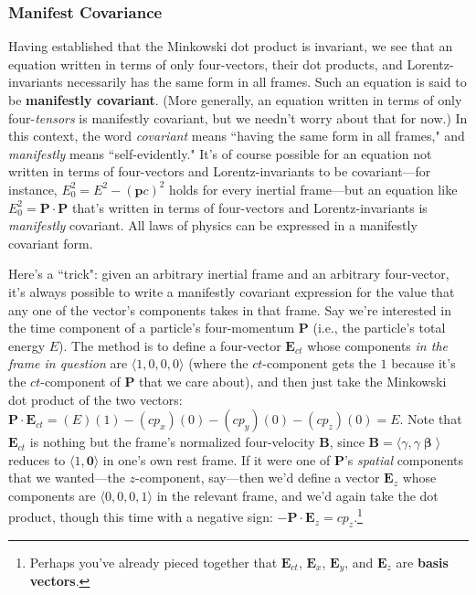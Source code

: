 \documentclass[12pt]{article}
\renewcommand{\vv}[1]{\mathbf{#1}}
\newcommand{\vvbeta}{\bm{\upbeta}}
\begin{document}
\subsubsection{Manifest Covariance}\label{sssec:mc}

Having established that the Minkowski dot product is invariant, we see that an equation written in terms of only four-vectors, their dot products, and Lorentz-invariants necessarily has the same form in all frames. Such an equation is said to be \textbf{manifestly covariant}. (More generally, an equation written in terms of only four-\emph{tensors} is manifestly covariant, but we needn't worry about that for now.) In this context, the word \emph{covariant} means ``having the same form in all frames," and \emph{manifestly} means ``self-evidently." It's of course possible for an equation not written in terms of four-vectors and Lorentz-invariants to be covariant---for instance, $E_0^2 = E^2 - (\vv p c)^2$ holds for every inertial frame---but an equation like ${E_0^2 = \vv P \cdot \vv P}$ that's written in terms of four-vectors and Lorentz-invariants is \emph{manifestly} covariant. All laws of physics can be expressed in a manifestly covariant form.

Here's a ``trick": given an arbitrary inertial frame and an arbitrary four-vector, it's always possible to write a manifestly covariant expression for the value that any one of the vector's components takes in that frame. Say we're interested in the time component of a particle's four-momentum $\vv P$ (i.e., the particle's total energy $E$). The method is to define a four-vector $\vv E _{ct}$ whose components \emph{in the frame in question} are $\langle 1, 0, 0, 0 \rangle$ (where the $ct$-component gets the $1$ because it's the $ct$-component of $\vv P$ that we care about), and then just take the Minkowski dot product of the two vectors: ${\vv P \cdot \vv E_{ct} = (E)(1) - (cp_x)(0) - (cp_y)(0) - (cp_z)(0) = E}$. Note that $\vv E_{ct}$ is nothing but the frame's normalized four-velocity $\vv B$, since $\vv B = \langle \gamma, \gamma \vvbeta \rangle$ reduces to $\langle 1, \vv 0 \rangle$ in one's own rest frame. If it were one of $\vv P$'s \emph{spatial} components that we wanted---the $z$-component, say---then we'd define a vector $\vv E_z$ whose components are $\langle 0, 0, 0, 1 \rangle$ in the relevant frame, and we'd again take the dot product, though this time with a negative sign: $- \vv P \cdot \vv E_z = c p_z$.\footnote{Perhaps you've already pieced together that $\vv E_{ct}$, $\vv E_{x}$, $\vv E_{y}$, and $\vv E_z$ are \textbf{basis vectors}.}
\end{document}
